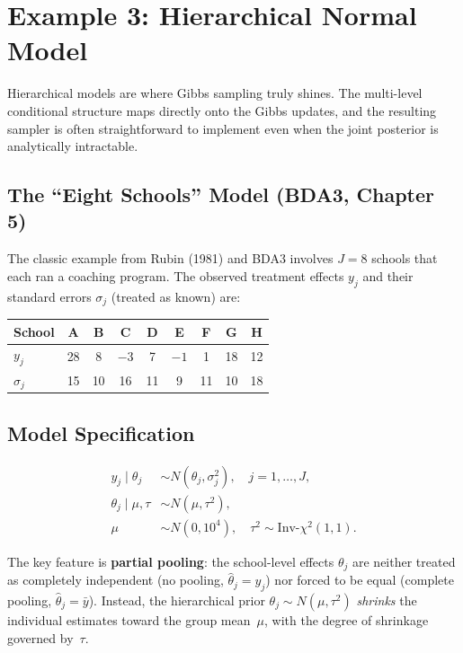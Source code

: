\documentclass[11pt]{article}
\begin{document}
\section{Example 3: Hierarchical Normal Model}

Hierarchical models are where Gibbs sampling truly shines.  The multi-level conditional structure maps directly onto the Gibbs updates, and the resulting sampler is often straightforward to implement even when the joint posterior is analytically intractable.

\subsection{The ``Eight Schools'' Model (BDA3, Chapter 5)}

The classic example from Rubin (1981) and BDA3 involves $J = 8$ schools that each ran a coaching program.  The observed treatment effects $y_j$ and their standard errors $\sigma_j$ (treated as known) are:

\begin{table}[H]
\centering
\begin{tabular}{lcccccccc}
\toprule
School & A & B & C & D & E & F & G & H \\
\midrule
$y_j$ & 28 & 8 & $-3$ & 7 & $-1$ & 1 & 18 & 12 \\
$\sigma_j$ & 15 & 10 & 16 & 11 & 9 & 11 & 10 & 18 \\
\bottomrule
\end{tabular}
\end{table}

\subsection{Model Specification}

\begin{align*}
  y_j \mid \theta_j &\sim N(\theta_j, \sigma_j^2), \quad j = 1, \ldots, J, \\
  \theta_j \mid \mu, \tau &\sim N(\mu, \tau^2), \\
  \mu &\sim N(0, 10^4), \quad \tau^2 \sim \text{Inv-}\chi^2(1, 1).
\end{align*}

The key feature is \textbf{partial pooling}: the school-level effects $\theta_j$ are neither treated as completely independent (no pooling, $\hat{\theta}_j = y_j$) nor forced to be equal (complete pooling, $\hat{\theta}_j = \bar{y}$).  Instead, the hierarchical prior $\theta_j \sim N(\mu, \tau^2)$ \emph{shrinks} the individual estimates toward the group mean~$\mu$, with the degree of shrinkage governed by~$\tau$.
\end{document}
